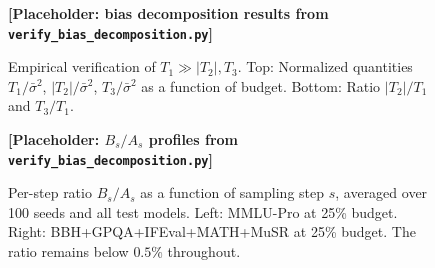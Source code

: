 \documentclass[11pt]{article}
\begin{document}
\begin{figure}[H]
    \centering
    \textbf{[Placeholder: bias decomposition results from \texttt{verify\_bias\_decomposition.py}]}
    \caption{Empirical verification of $T_1 \gg |T_2|, T_3$. Top: Normalized quantities $T_1/\bar{\sigma}^2$, $|T_2|/\bar{\sigma}^2$, $T_3/\bar{\sigma}^2$ as a function of budget. Bottom: Ratio $|T_2|/T_1$ and $T_3/T_1$.}
    \label{fig:bias-decomposition}
\end{figure}

\begin{figure}[H]
    \centering
    \textbf{[Placeholder: $B_s/A_s$ profiles from \texttt{verify\_bias\_decomposition.py}]}
    \caption{Per-step ratio $B_s/A_s$ as a function of sampling step $s$, averaged over 100 seeds and all test models. Left: MMLU-Pro at 25\% budget. Right: BBH+GPQA+IFEval+MATH+MuSR at 25\% budget. The ratio remains below $0.5\%$ throughout.}
    \label{fig:Bs-As-profiles}
\end{figure}
\end{document}
